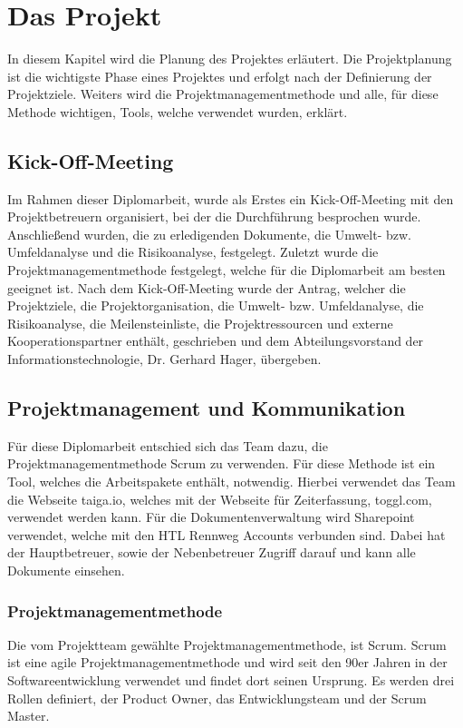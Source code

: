 \chapter{Das Projekt}

In diesem Kapitel wird die Planung des Projektes erläutert. Die Projektplanung ist die wichtigste Phase eines Projektes und erfolgt nach der Definierung der Projektziele.   Weiters wird die Projektmanagementmethode und alle, für diese Methode wichtigen, Tools, welche verwendet wurden, erklärt.

\section{Kick-Off-Meeting}

Im Rahmen dieser Diplomarbeit, wurde als Erstes ein Kick-Off-Meeting mit den Projektbetreuern organisiert, bei der die Durchführung besprochen wurde. Anschließend wurden, die zu erledigenden Dokumente, die Umwelt- bzw. Umfeldanalyse und die Risikoanalyse, festgelegt. Zuletzt wurde die Projektmanagementmethode festgelegt, welche für die Diplomarbeit am besten geeignet ist. Nach dem Kick-Off-Meeting wurde der Antrag, welcher die Projektziele, die Projektorganisation, die Umwelt- bzw. Umfeldanalyse, die Risikoanalyse, die Meilensteinliste, die Projektressourcen und externe Kooperationspartner enthält, geschrieben und dem Abteilungsvorstand der Informationstechnologie, Dr. Gerhard Hager, übergeben.

\section{Projektmanagement und Kommunikation}

Für diese Diplomarbeit entschied sich das Team dazu, die Projektmanagementmethode Scrum zu verwenden. Für diese Methode ist ein Tool, welches die Arbeitspakete enthält, notwendig. Hierbei verwendet das Team die Webseite taiga.io, welches mit der Webseite für Zeiterfassung, toggl.com, verwendet werden kann. Für die Dokumentenverwaltung wird Sharepoint verwendet, welche mit den HTL Rennweg Accounts verbunden sind. Dabei hat der Hauptbetreuer, sowie der Nebenbetreuer Zugriff darauf und kann alle Dokumente einsehen.

\subsection{Projektmanagementmethode} 

Die vom Projektteam gewählte Projektmanagementmethode, ist Scrum. Scrum ist eine agile Projektmanagementmethode und wird seit den 90er Jahren in der Softwareentwicklung verwendet und findet dort seinen Ursprung. Es werden drei Rollen definiert, der Product Owner, das Entwicklungsteam und der Scrum Master. 


